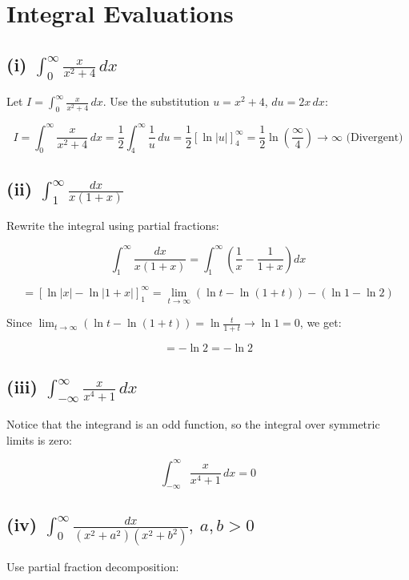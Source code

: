 \documentclass{article}
\begin{document}
\section*{Integral Evaluations}

\subsection*{(i) \(\int_0^\infty \frac{x}{x^2 + 4} \, dx\)}
Let \( I = \int_0^\infty \frac{x}{x^2 + 4} \, dx \). Use the substitution \( u = x^2 + 4 \), \( du = 2x \, dx \):


\[
I = \int_0^\infty \frac{x}{x^2 + 4} \, dx = \frac{1}{2} \int_4^\infty \frac{1}{u} \, du = \frac{1}{2} \left[ \ln |u| \right]_4^\infty = \frac{1}{2} \ln \left( \frac{\infty}{4} \right) \rightarrow \infty \text{ (Divergent)}
\]



\subsection*{(ii) \(\int_1^\infty \frac{dx}{x(1 + x)}\)}
Rewrite the integral using partial fractions:


\[
\int_1^\infty \frac{dx}{x(1 + x)} = \int_1^\infty \left( \frac{1}{x} - \frac{1}{1 + x} \right) dx
\]




\[
= \left[ \ln|x| - \ln|1 + x| \right]_1^\infty = \lim_{t \to \infty} (\ln t - \ln(1 + t)) - (\ln 1 - \ln 2)
\]


Since \(\lim_{t \to \infty} (\ln t - \ln(1 + t)) = \ln \frac{t}{1 + t} \to \ln 1 = 0\), we get:


\[
= - \ln 2 = -\ln 2
\]



\subsection*{(iii) \(\int_{-\infty}^\infty \frac{x}{x^4 + 1} \, dx\)}
Notice that the integrand is an odd function, so the integral over symmetric limits is zero:


\[
\int_{-\infty}^\infty \frac{x}{x^4 + 1} \, dx = 0
\]



\subsection*{(iv) \(\int_0^\infty \frac{dx}{(x^2 + a^2)(x^2 + b^2)}, \ a, b > 0 \)}
Use partial fraction decomposition:
\end{document}

